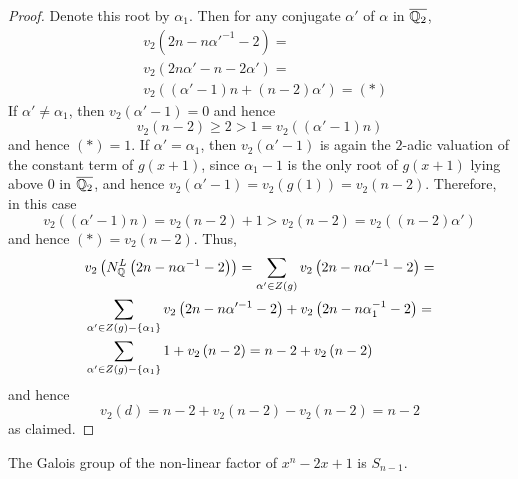 \documentclass[../main.tex]{subfiles}
\begin{document}
\begin{proof}
  Denote this root by $\alpha_1$.
  Then for any conjugate $\alpha'$ of $\alpha$ in $\overline{\mathbb{Q}_2}$,  
  \begin{align*}
    & v_2\left( 2n - n\alpha'^{-1} - 2 \right) = \\
    & v_2\left( 2n\alpha' - n - 2\alpha' \right) = \\
    & v_2\left( \left( \alpha' - 1 \right)n + \left( n - 2 \right)\alpha' \right) = \left( \ast \right)
  \end{align*}
  If $\alpha' \neq \alpha_1$, then $v_2\left( \alpha' - 1 \right) = 0$ and hence 
  \[
    v_2\left( n - 2 \right) \geq 2 > 1 = v_2\left( \left( \alpha' - 1 \right)n \right)
  \]
  and hence $\left( \ast \right) = 1$.
  If $\alpha' = \alpha_1$, then $v_2\left( \alpha' - 1 \right)$ is again the $2$-adic valuation of the constant term of $g\left( x + 1 \right)$, since $\alpha_1 - 1$ is the only root of $g\left( x + 1 \right)$ lying above $0$ in $\overline{\mathbb{Q}_2}$, and hence $v_2\left( \alpha' - 1 \right) = v_2\left( g\left( 1 \right) \right) = v_2\left( n - 2 \right)$.
  Therefore, in this case 
  \[
    v_2\left( \left( \alpha' - 1 \right)n \right) = v_2\left( n - 2 \right) + 1 > v_2\left( n - 2 \right) = v_2\left( \left( n - 2 \right)\alpha' \right)
  \]
   and hence $\left( \ast \right) = v_2\left( n - 2 \right)$.
   Thus,
  \begin{align*}
    & v_2\left( N^L_{\mathbb{Q}}\left( 2n - n\alpha^{-1} - 2 \right) \right) =
    \sum_{\alpha' \in Z\left( g \right)} v_2\left( 2n - n\alpha'^{-1} - 2 \right) = \\
    & \sum_{\alpha' \in Z\left( g \right) - \left\{ \alpha_1 \right\}} v_2\left( 2n - n\alpha'^{-1} - 2 \right) + v_2\left( 2n - n\alpha_1^{-1} - 2 \right) = \\
    & \sum_{\alpha' \in Z\left( g \right) - \left\{ \alpha_1 \right\}} 1 + v_2\left( n - 2 \right) = n - 2 + v_2\left( n - 2 \right)
  \end{align*}
  and hence \[
    v_2\left( d \right) = n - 2 + v_2\left( n - 2 \right) - v_2\left( n - 2 \right) = n - 2
  \]
  as claimed.
\end{proof} 
\begin{corollary}
  \label{cor:the_galois_group_of_x^n-2x+1}
  The Galois group of the non-linear factor of $x^n - 2x + 1$ is $S_{n-1}$.
\end{corollary}
\end{document}
